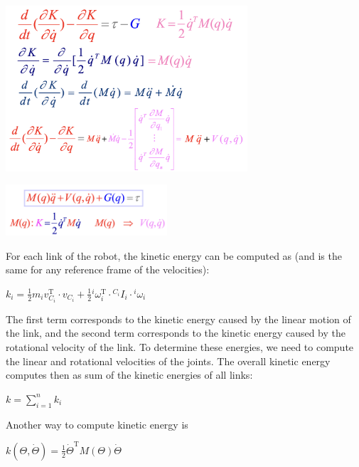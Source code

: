 \begin{minipage}[c]{0.5\textwidth}
	\includegraphics[width=9cm]{sections/imgs/6_lagrange_mvg.png}
\end{minipage}
\hfill
\begin{minipage}[c]{0.5\textwidth}
\begin{center}
	\includegraphics[width=6cm]{sections/imgs/6_lagrange_vmg_2.png}
\end{center}

\end{minipage}

For each link of the robot, the kinetic energy can be computed as (and is the same for any reference frame of the velocities):

\begin{center}
	$k_{i}=\frac{1}{2} m_{i} v_{C_{i}}^{\mathrm{T}} \cdot v_{C_{i}}+\frac{1}{2} {}^i \omega_{i}^{\mathrm{T}} \cdot{ }^{C_{i}} I_{i} \cdot{ }^{i} \omega_{i}$
\end{center}

The first term corresponds to the kinetic energy caused by the linear motion of the link, and the second term corresponds to the kinetic energy caused by the rotational velocity of the link. To determine these energies, we need to compute the linear and rotational velocities of the joints. The overall kinetic energy computes then as sum of the kinetic energies of all links:

\begin{center}
	$k=\sum_{i=1}^{n} k_{i}$
\end{center}

Another way to compute kinetic energy is

\begin{center}
	$k(\Theta, \dot{\Theta})=\frac{1}{2} \dot{\Theta}^{\mathrm{T}} M(\Theta) \dot{\Theta}$
\end{center}

